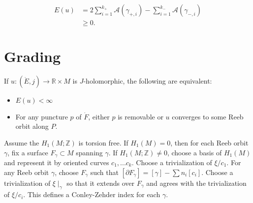 \begin{proposition}

\begin{align*}
E(u)&= 2\sum_{i=1}^{k_+} \mathcal{A}(\gamma_{+,i})-\sum_{i=1}^{k_-} \mathcal{A}(\gamma_{-,i}) \\
&\ge 0.
\end{align*}

\end{proposition}

\section{Grading}

\begin{theorem}

If $u: (\dot{E}, j)\to \mathbb{R}\times M$ is $J$-holomorphic, the following are equivalent:
\begin{itemize}
\item $E(u)<\infty$
\item For any puncture $p$ of $\dot{F}$, either $p$ is removable or $u$ converges to some Reeb orbit along $P$.
\end{itemize}

\end{theorem}

Assume the $H_1(M; \mathbb{Z})$ is torsion free. If $H_1(M)=0$, then for each Reeb orbit $\gamma$, fix a surface $F_\gamma \subset M$ spanning $\gamma$. If $H_1(M; \mathbb{Z})\neq 0$, choose a basis of $H_1(M)$ and represent it by oriented curves $c_1,...c_k$. Choose a trivialization of $\xi/c_1$. For any Reeb orbit $\gamma$, choose $F_\gamma$ such that $[\partial F_\gamma]=[\gamma]-\sum n_i [c_i]$. Choose a trivialization of $\xi \mid_{\gamma}$ so that it extends over $F_\gamma$ and agrees with the trivialization of $\xi/c_i$. This defines a Conley-Zehder index for each $\gamma$.


